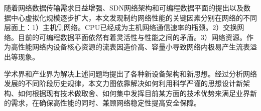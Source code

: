 




\label{chap25}

随着网络数据传输需求日益增强、SDN网络架构和可编程数据平面的提出以及数据中心虚拟化规模逐步扩大，本文发现制约网络性能的关键因素分别在网络的不同层面上：1）主机侧网络。CPU已经成为主机网络通信速率的瓶颈。2）交换网络。目前的可编程数据平面依然有着灵活性与性能之间的矛盾。3）网络资源。作为高性能网络内设备核心资源的流表因造价高、容量小导致网络内极易产生流表溢出等现象。

学术界和产业界为解决上述问题均提出了各种新设备架构和新思想。经过分析网络发展的不同阶段历史规律，本文力图依靠解决如何利用科学严谨的思想设计新架构、如何根据现有技术做取舍、如何集中发挥目前某方面的技术优势来满足业界新的需求，在确保高性能的同时、兼顾网络稳定性提高安全保障。












































